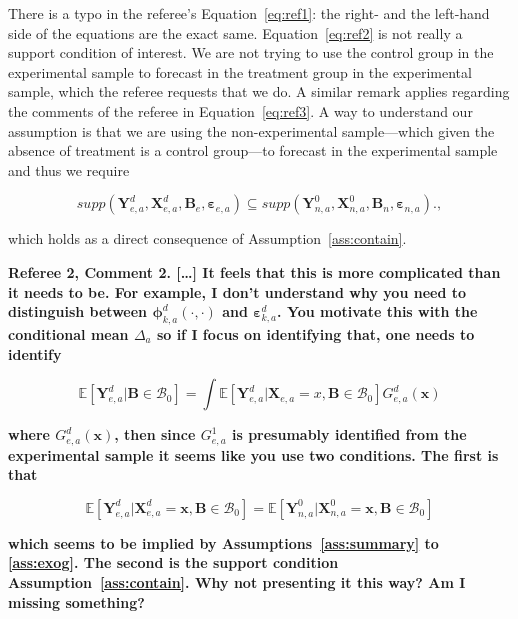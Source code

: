 There is a typo in the referee's Equation~\eqref{eq:ref1}: the right- and the left-hand side of the equations are the exact same. Equation~\eqref{eq:ref2} is not really a support condition of interest. We are not trying to use the control group in the experimental sample to forecast in the treatment group in the experimental sample, which the referee requests that we do. A similar remark applies regarding the comments of the referee in Equation~\eqref{eq:ref3}. A way to understand our assumption is that we are using the non-experimental sample---which given the absence of treatment is a control group---to forecast in the experimental sample and thus we require

\begin{equation}
supp( \bm{Y}_{e,a}^d, \bm{X}^d_{e,a}, \bm{B}_e, \bm{\varepsilon}_{e,a} ) \subseteq supp( \bm{Y}_{n,a}^0, \bm{X}^0_{n,a}, \bm{B}_n, \bm{\varepsilon}_{n,a} ).  \label{eq:ref4},
\end{equation}

which holds as a direct consequence of Assumption~\ref{ass:contain}. 

\noindent \textbf{Referee 2, Comment 2. [\ldots] It feels that this is more complicated than it needs to be. For example, I don't understand why you need to distinguish between $\bm{\phi}_{k,a}^d \left( \cdot, \cdot \right) $ and $\bm{\varepsilon}_{k,a}^d$. You motivate this with the conditional mean $\Delta_a$ so if I focus on identifying that, one needs to identify}

\begin{equation}
\mathbb{E} \left[ \bm{Y}_{e,a}^d | \bm{B} \in \mathcal{B}_0 \right] = \int \mathbb{E} \left[ \bm{Y}_{e,a}^d | \bm{X}_{e,a} = x, \bm{B} \in \mathcal{B}_0 \right] G_{e,a}^d \left( \bm{x} \right)
\end{equation}

\textbf{where $G_{e,a}^d \left( \bm{x} \right)$, then since $G_{e,a}^1$ is presumably identified from the experimental sample it seems like you use two conditions. The first is that}

\begin{equation}
\mathbb{E} \left[  \bm{Y}_{e,a}^d | \bm{X}_{e,a}^d = \bm{x},  \bm{B} \in \mathcal{B}_0 \right] = \mathbb{E} \left[  \bm{Y}_{n,a}^0 | \bm{X}_{n,a}^0 = \bm{x},  \bm{B} \in \mathcal{B}_0 \right]  \label{eq:ref4}
\end{equation}

\textbf{which seems to be implied by Assumptions~\ref{ass:summary} to \ref{ass:exog}. The second is the support condition Assumption~\ref{ass:contain}. Why not presenting it this way? Am I missing something?}

